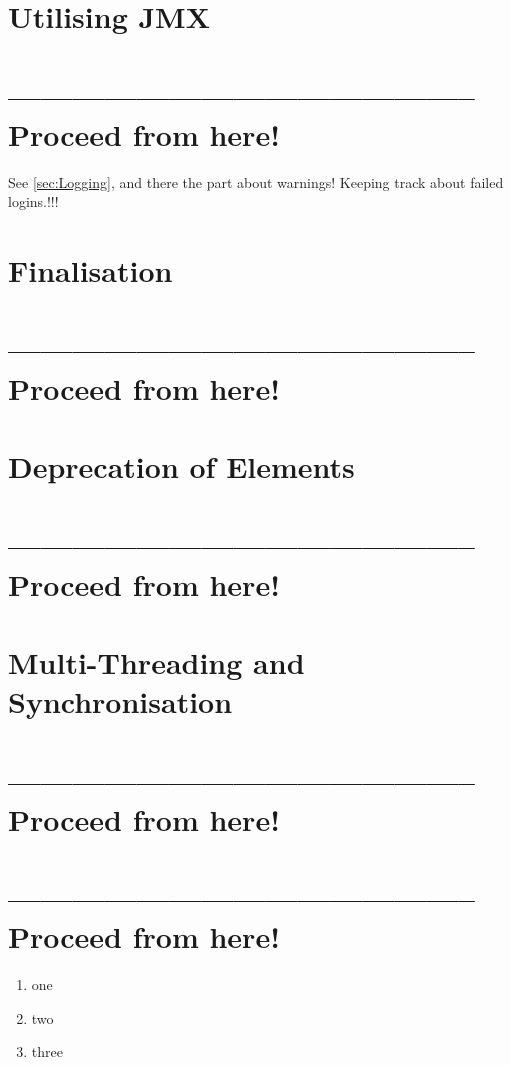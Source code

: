 \documentclass[11pt,a4paper, titlepage, parskip=half, headsepline, footsepline, cleardoublepage=current, headheight=1cm]{scrbook}
\begin{document}
\section{Utilising JMX}\label{sec:UtilisingJMX}
\section{-------------------------------------------- Proceed from here!}
See \ref{sec:Logging}, and there the part about warnings! Keeping track about failed logins.!!!
\lipsum[1]


\section{Finalisation}\label{sec:Finalisation}
\section{-------------------------------------------- Proceed from here!}
\lipsum[1]

\section{Deprecation of Elements}\label{sec:DeprecationOfElements}
\section{-------------------------------------------- Proceed from here!}
\lipsum[1]

\section{Multi-Threading and Synchronisation}\label{sec:MultiThreading}
\section{-------------------------------------------- Proceed from here!}
\lipsum[1]

\hrulefill\newpage 
\section{-------------------------------------------- Proceed from here!}
\lipsum[1]

\begin{enumerate}[label=P\arabic*.]
\item{one}
\item{two}
\item{three}
\end{enumerate}
\end{document}
